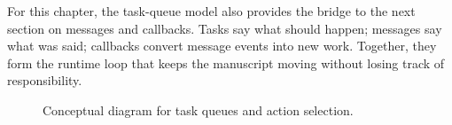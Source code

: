 For this chapter, the task-queue model also provides the bridge to the next section on messages and callbacks. Tasks say what should happen; messages say what was said; callbacks convert message events into new work. Together, they form the runtime loop that keeps the manuscript moving without losing track of responsibility.

\begin{figure}[htbp]
\centering

\caption{Conceptual diagram for task queues and action selection.}
\end{figure}
